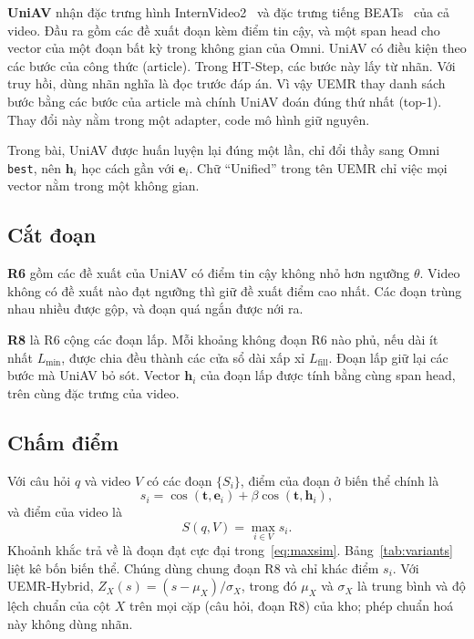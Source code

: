 \documentclass{IEEEtran}
\begin{document}
\textbf{UniAV} nhận đặc trưng hình InternVideo2~\cite{internvideo2} và đặc trưng tiếng BEATs~\cite{beats} của cả video. Đầu ra gồm các đề xuất đoạn kèm điểm tin cậy, và một span head cho vector của một đoạn bất kỳ trong không gian của Omni. UniAV có điều kiện theo các bước của công thức (article). Trong HT-Step, các bước này lấy từ nhãn. Với truy hồi, dùng nhãn nghĩa là đọc trước đáp án. Vì vậy UEMR thay danh sách bước bằng các bước của article mà chính UniAV đoán đúng thứ nhất (top-1). Thay đổi này nằm trong một adapter, code mô hình giữ nguyên.

Trong bài, UniAV được huấn luyện lại đúng một lần, chỉ đổi thầy sang Omni \texttt{best}, nên $\mathbf{h}_i$ học cách gần với $\mathbf{e}_i$. Chữ ``Unified'' trong tên UEMR chỉ việc mọi vector nằm trong một không gian.

\subsection{Cắt đoạn}
\textbf{R6} gồm các đề xuất của UniAV có điểm tin cậy không nhỏ hơn ngưỡng $\theta$. Video không có đề xuất nào đạt ngưỡng thì giữ đề xuất điểm cao nhất. Các đoạn trùng nhau nhiều được gộp, và đoạn quá ngắn được nới ra.

\textbf{R8} là R6 cộng các đoạn lấp. Mỗi khoảng không đoạn R6 nào phủ, nếu dài ít nhất $L_{\min}$, được chia đều thành các cửa sổ dài xấp xỉ $L_{\mathrm{fill}}$. Đoạn lấp giữ lại các bước mà UniAV bỏ sót. Vector $\mathbf{h}_i$ của đoạn lấp được tính bằng cùng span head, trên cùng đặc trưng của video.

\subsection{Chấm điểm}
Với câu hỏi $q$ và video $V$ có các đoạn $\{S_i\}$, điểm của đoạn ở biến thể chính là
\begin{equation}
\label{eq:full}
s_i = \cos(\mathbf{t}, \mathbf{e}_i) + \beta \cos(\mathbf{t}, \mathbf{h}_i),
\end{equation}
và điểm của video là
\begin{equation}
\label{eq:maxsim}
S(q, V) = \max_{i \in V} s_i .
\end{equation}
Khoảnh khắc trả về là đoạn đạt cực đại trong~\eqref{eq:maxsim}. Bảng~\ref{tab:variants} liệt kê bốn biến thể. Chúng dùng chung đoạn R8 và chỉ khác điểm $s_i$. Với UEMR-Hybrid, $Z_X(s) = (s - \mu_X)/\sigma_X$, trong đó $\mu_X$ và $\sigma_X$ là trung bình và độ lệch chuẩn của cột $X$ trên mọi cặp (câu hỏi, đoạn R8) của kho; phép chuẩn hoá này không dùng nhãn.
\end{document}
